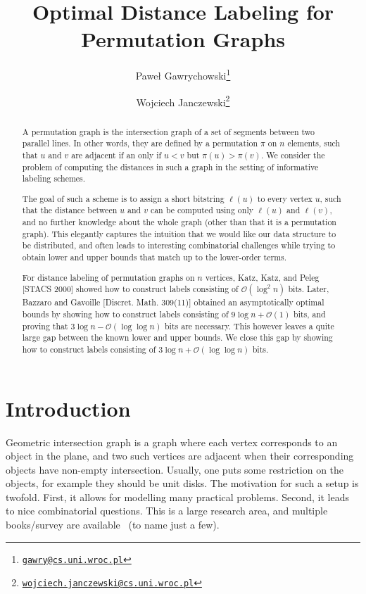 \documentclass[a4paper,11pt]{article}
\title{Optimal Distance Labeling for Permutation Graphs}
\author[ ]{Paweł Gawrychowski\thanks{\texttt{\href{mailto:gawry@cs.uni.wroc.pl}{gawry@cs.uni.wroc.pl}}}}
\author[ ]{Wojciech Janczewski\thanks{\texttt{\href{mailto:wojciech.janczewski@cs.uni.wroc.pl}{wojciech.janczewski@cs.uni.wroc.pl}}}}
\affil[ ]{University of Wrocław}
\date{}
\newcommand{\Oh}{\mathcal{O}}
\begin{document}
\maketitle

\begin{abstract}
A permutation graph is the intersection graph of a set of segments between two parallel lines. In other words, they are defined by
a permutation $\pi$ on $n$ elements, such that $u$ and $v$ are adjacent if an only if $u<v$ but $\pi(u)>\pi(v)$. We consider
the problem of computing the distances in such a graph in the setting of informative labeling schemes.

The goal of such a scheme is to assign a short bitstring $\ell(u)$ to every vertex $u$, such that the distance between $u$ and $v$
can be computed using only $\ell(u)$ and $\ell(v)$, and no further knowledge about the whole graph (other than that it is a permutation
graph). This elegantly captures the intuition that we would like our data structure to be distributed, and often leads to interesting
combinatorial challenges while trying to obtain lower and upper bounds that match up to the lower-order terms.

For distance labeling of permutation graphs on $n$ vertices,  Katz, Katz, and Peleg [STACS 2000] showed how to construct
labels consisting of $\Oh(\log^{2} n)$ bits. Later, Bazzaro and Gavoille [Discret. Math. 309(11)] obtained an asymptotically optimal
bounds by showing how to construct labels consisting of $9\log{n}+\Oh(1)$ bits, and proving that $3\log{n}-\Oh(\log{\log{n}})$ bits
are necessary. This however leaves a quite large gap between the known lower and upper bounds.
We close this gap by showing how to construct labels consisting of $3\log{n}+\Oh(\log\log n)$ bits.
\end{abstract}

\thispagestyle{empty}
\clearpage
\setcounter{page}{1}

\section{Introduction}
Geometric intersection graph is a graph where each vertex corresponds to an object in the plane, and two such vertices
are adjacent when their corresponding objects have non-empty intersection. Usually, one puts some restriction on the objects,
for example they should be unit disks. The motivation for such a setup is twofold. First, it allows for modelling many
practical problems. Second, it leads to nice combinatorial questions. This is a large research area, and multiple books/survey
are available~\cite{doi:10.1137/1.9780898719802,pal2013intersection,ellis2022intersection,hlinveny2001representing}
(to name just a few).
\end{document}
